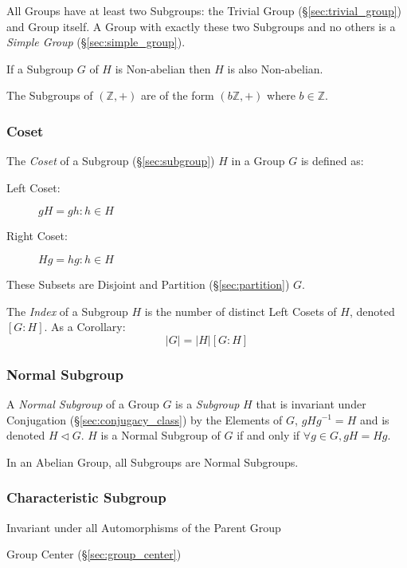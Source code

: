 All Groups have at least two Subgroups: the Trivial Group
(\S\ref{sec:trivial_group}) and Group itself. A Group with exactly
these two Subgroups and no others is a \emph{Simple Group}
(\S\ref{sec:simple_group}).

If a Subgroup $G$ of $H$ is Non-abelian then $H$ is also Non-abelian.

The Subgroups of $(\mathbb{Z},+)$ are of the form $(b\mathbb{Z},+)$
where $b \in \mathbb{Z}$.



\subsubsection{Coset}\label{sec:coset}

The \emph{Coset} of a Subgroup (\S\ref{sec:subgroup}) $H$ in a Group
$G$ is defined as:
\begin{description}
\item[Left Coset:] $gH = {gh : h \in H}$
\item[Right Coset:] $Hg = {hg : h \in H}$
\end{description}
These Subsets are Disjoint and Partition (\S\ref{sec:partition}) $G$.

The \emph{Index} of a Subgroup $H$ is the number of distinct Left
Cosets of $H$, denoted $[G:H]$. As a Corollary:
\[
    |G| = |H|[G:H]
\]



\subsubsection{Normal Subgroup}\label{sec:normal_subgroup}

A \emph{Normal Subgroup} of a Group $G$ is a \emph{Subgroup} $H$ that is
invariant under Conjugation (\S\ref{sec:conjugacy_class}) by the Elements of
$G$, $gHg^{-1} = H$ and is denoted $H \triangleleft G$. $H$ is a Normal Subgroup
of $G$ if and only if $\forall g \in G, gH = Hg$.

In an Abelian Group, all Subgroups are Normal Subgroups.



\subsubsection{Characteristic Subgroup}\label{sec:characteristic_subgroup}

Invariant under all Automorphisms of the Parent Group

Group Center (\S\ref{sec:group_center})



